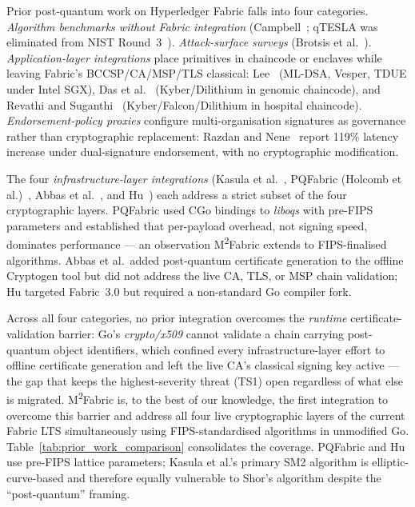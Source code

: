 \documentclass{ieeetj}
\newcommand{\mfabric}{M\textsuperscript{2}Fabric}
\begin{document}
Prior post-quantum work on Hyperledger Fabric falls into four categories.
\emph{Algorithm benchmarks without Fabric integration}
(Campbell~\cite{campbell2019, campbell2019eval}; qTESLA was eliminated
from NIST Round~3~\cite{alagic2022nist}).
\emph{Attack-surface surveys} (Brotsis et al.~\cite{brotsis2020}).
\emph{Application-layer integrations} place primitives in chaincode or
enclaves while leaving Fabric's BCCSP/CA/MSP/TLS classical:
Lee~\cite{lee2025} (ML-DSA, Vesper, TDUE under Intel SGX), Das et
al.~\cite{das2025genomic} (Kyber/Dilithium in genomic chaincode), and
Revathi and Suganthi~\cite{revathi2025} (Kyber/Falcon/Dilithium in
hospital chaincode). \emph{Endorsement-policy proxies} configure
multi-organisation signatures as governance rather than cryptographic
replacement: Razdan and Nene~\cite{razdan2025postquantum} report 119\%
latency increase under dual-signature endorsement, with no cryptographic
modification.

The four \emph{infrastructure-layer integrations}
(Kasula et al.~\cite{kasula2025}, PQFabric (Holcomb et
al.)~\cite{holcomb2021}, Abbas et al.~\cite{abbas2025}, and
Hu~\cite{hu2025prototype}) each address a strict subset of the four
cryptographic layers. PQFabric used CGo bindings to \textit{liboqs} with
pre-FIPS parameters and established that per-payload overhead, not
signing speed, dominates performance — an observation \mfabric{} extends
to FIPS-finalised algorithms. Abbas et al.\ added post-quantum
certificate generation to the offline Cryptogen tool but did not address
the live CA, TLS, or MSP chain validation; Hu targeted Fabric~3.0 but
required a non-standard Go compiler fork.

Across all four categories, no prior integration overcomes the
\emph{runtime} certificate-validation barrier: Go's \textit{crypto/x509}
cannot validate a chain carrying post-quantum object identifiers, which
confined every infrastructure-layer effort to offline certificate
generation and left the live CA's classical signing key active --- the
gap that keeps the highest-severity threat (TS1) open regardless of what
else is migrated. \mfabric{} is, to the best of our knowledge, the
first integration to overcome this barrier and address all four live
cryptographic layers of the current Fabric LTS simultaneously using
FIPS-standardised algorithms in unmodified Go. Table~\ref{tab:prior_work_comparison} consolidates the
coverage. PQFabric and Hu use pre-FIPS lattice
parameters; Kasula et al.'s primary SM2 algorithm is elliptic-curve-based
and therefore equally vulnerable to Shor's algorithm despite the
``post-quantum'' framing.
\end{document}
